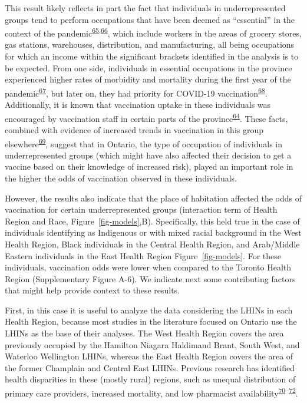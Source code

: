 \documentclass[
]{article}
\begin{document}
This result likely reflects in part the fact that individuals in
underrepresented groups tend to perform occupations that have been
deemed as ``essential'' in the context of the
pandemic\textsuperscript{\protect\hyperlink{ref-hawkins2020}{65},\protect\hyperlink{ref-ct2021}{66}},
which include workers in the areas of grocery stores, gas stations,
warehouses, distribution, and manufacturing, all being occupations for
which an income within the significant brackets identified in the
analysis is to be expected. From one side, individuals in essential
occupations in the province experienced higher rates of morbidity and
mortality during the first year of the
pandemic\textsuperscript{\protect\hyperlink{ref-rao2021}{67}}, but later
on, they had priority for COVID-19
vaccination\textsuperscript{\protect\hyperlink{ref-mishra2021}{68}}.
Additionally, it is known that vaccination uptake in these individuals
was encouraged by vaccination staff in certain parts of the
province\textsuperscript{\protect\hyperlink{ref-gill2022}{64}}. These
facts, combined with evidence of increased trends in vaccination in this
group
elsewhere\textsuperscript{\protect\hyperlink{ref-nguyen2021b}{69}},
suggest that in Ontario, the type of occupation of individuals in
underrepresented groups (which might have also affected their decision
to get a vaccine based on their knowledge of increased risk), played an
important role in the higher the odds of vaccination observed in these
individuals.

However, the results also indicate that the place of habitation affected
the odds of vaccination for certain underrepresented groups (interaction
term of Health Region and Race, Figure~\ref{fig-models},B).
Specifically, this held true in the case of individuals identifying as
Indigenous or with mixed racial background in the West Health Region,
Black individuals in the Central Health Region, and Arab/Middle Eastern
individuals in the East Health Region Figure~\ref{fig-models}. For these
individuals, vaccination odds were lower when compared to the Toronto
Health Region (Supplementary Figure A-6). We indicate next some
contributing factors that might help provide context to these results.

First, in this case it is useful to analyze the data considering the
LHINs in each Health Region, because most studies in the literature
focused on Ontario use the LHINs as the base of their analyses. The West
Health Region covers the area previously occupied by the Hamilton
Niagara Haldimand Brant, South West, and Waterloo Wellington LHINs,
whereas the East Health Region covers the area of the former Champlain
and Central East LHINs. Previous research has identified health
disparities in these (mostly rural) regions, such as unequal
distribution of primary care providers, increased mortality, and low
pharmacist
availability\textsuperscript{\protect\hyperlink{ref-shah2019}{70}--\protect\hyperlink{ref-timony2022}{72}}.
\end{document}
